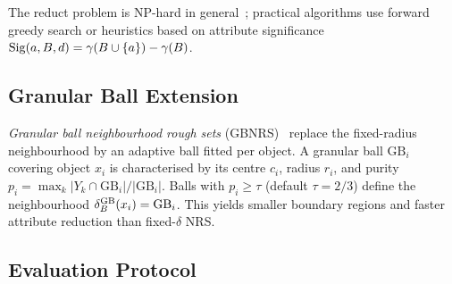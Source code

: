 The reduct problem is NP-hard in general~\cite{Skowron1992}; practical
algorithms use forward greedy search or heuristics based on attribute
significance $\mathrm{Sig}(a, B, d) = \gamma(B \cup \{a\}) - \gamma(B)$.

\subsection{Granular Ball Extension}
\label{sec:gbnrs}

\emph{Granular ball neighbourhood rough sets} (GBNRS)~\cite{Xia2020GBNRS}
replace the fixed-radius neighbourhood by an adaptive ball fitted per object.
A granular ball $\mathrm{GB}_i$ covering object $x_i$ is characterised by
its centre $c_i$, radius $r_i$, and purity
$p_i = \max_k |Y_k \cap \mathrm{GB}_i| / |\mathrm{GB}_i|$.
Balls with $p_i \geq \tau$ (default $\tau = 2/3$) define the neighbourhood
$\delta_{B}^{\mathrm{GB}}(x_i) = \mathrm{GB}_i$.  This yields smaller boundary
regions and faster attribute reduction than fixed-$\delta$ NRS.

\subsection{Evaluation Protocol}
\label{sec:protocol}


